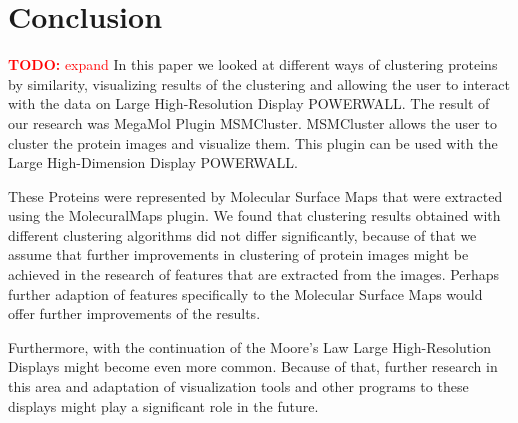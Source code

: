 \documentclass[journal]{vgtc}       %
\newcommand{\todo}[1]{\textcolor{red}{\textbf{TODO:} #1}}
\begin{document}
\section{Conclusion}
\todo{expand}
In this paper we looked at different ways of clustering proteins by similarity, visualizing results of the clustering and allowing the user to interact with the data on Large High-Resolution Display POWERWALL. The result of our research was MegaMol Plugin MSMCluster. MSMCluster allows the user to cluster the protein images and visualize them. This plugin can be used with the Large High-Dimension Display POWERWALL. 

These Proteins were represented by Molecular Surface Maps that were extracted using the MolecuralMaps plugin.
We found that clustering results obtained with different clustering algorithms did not differ significantly, because of that we assume that further improvements in clustering of protein images might be achieved in the research of features that are extracted from the images. Perhaps further adaption of features specifically to the Molecular Surface Maps would offer further improvements of the results. 

Furthermore, with the continuation of the Moore's Law Large High-Resolution Displays might become even more common. Because of that, further research in this area and adaptation of visualization tools and other programs to these displays might play a significant role in the future.




\end{document}
